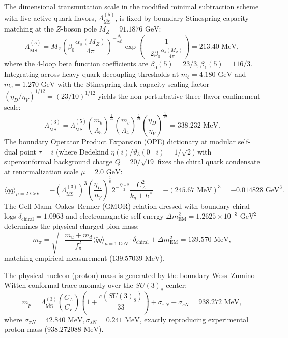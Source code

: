 \documentclass[11pt,letterpaper]{article}
\theoremstyle{plain}
\begin{document}
The dimensional transmutation scale in the modified minimal subtraction scheme with five active quark flavors, $\Lambda_{\overline{\text{MS}}}^{(5)}$, is fixed by boundary Stinespring capacity matching at the $Z$-boson pole $M_Z = 91.1876\text{ GeV}$:
\begin{equation}
\Lambda_{\overline{\text{MS}}}^{(5)} = M_Z \left( \beta_0 \frac{\alpha_s(M_Z)}{4\pi} \right)^{-\frac{\beta_1}{2\beta_0^2}} \exp\left( -\frac{1}{2\beta_0 \frac{\alpha_s(M_Z)}{4\pi}} \right) = 213.40\text{ MeV},
\end{equation}
where the 4-loop beta function coefficients are $\beta_0(5) = 23/3, \beta_1(5) = 116/3$. Integrating across heavy quark decoupling thresholds at $m_b = 4.180\text{ GeV}$ and $m_c = 1.270\text{ GeV}$ with the Stinespring dark capacity scaling factor $(\eta_D / \eta_V)^{1/12} = (23/10)^{1/12}$ yields the non-perturbative three-flavor confinement scale:
\begin{equation}
\Lambda_{\overline{\text{MS}}}^{(3)} = \Lambda_{\overline{\text{MS}}}^{(5)} \left(\frac{m_b}{\Lambda_5}\right)^{\frac{2}{25}} \left(\frac{m_c}{\Lambda_4}\right)^{\frac{2}{27}} \left( \frac{\eta_D}{\eta_V} \right)^{\frac{1}{12}} = 338.232\text{ MeV}.
\end{equation}
The boundary Operator Product Expansion (OPE) dictionary at modular self-dual point $\tau = i$ (where Dedekind $\eta(i) / \vartheta_3(0 \mid i) = 1/\sqrt{2}$) with superconformal background charge $Q = 20/\sqrt{19}$ fixes the chiral quark condensate at renormalization scale $\mu = 2.0\text{ GeV}$:
\begin{equation}
\langle \bar{q}q \rangle_{\mu = 2\text{ GeV}} = - \left(\Lambda_{\overline{\text{MS}}}^{(3)}\right)^3 \left( \frac{\eta_D}{\eta_V} \right)^{\frac{1}{6}} 2^{-\frac{Q-2}{2}} \frac{C_A^2}{k_q + h^\vee} = - (245.67\text{ MeV})^3 = - 0.014828\text{ GeV}^3.
\end{equation}
The Gell-Mann--Oakes--Renner (GMOR) relation dressed with boundary chiral logs $\delta_{\mathrm{chiral}} = 1.0963$ and electromagnetic self-energy $\Delta m_{\mathrm{EM}}^2 = 1.2625 \times 10^{-3}\text{ GeV}^2$ determines the physical charged pion mass:
\begin{equation}
m_\pi = \sqrt{ -\frac{m_u + m_d}{f_\pi^2} \langle \bar{q}q \rangle_{\mu=1\text{ GeV}} \cdot \delta_{\mathrm{chiral}} + \Delta m_{\mathrm{EM}}^2 } = 139.570\text{ MeV},
\end{equation}
matching empirical measurement ($139.57039\text{ MeV}$).

The physical nucleon (proton) mass is generated by the boundary Wess--Zumino--Witten conformal trace anomaly over the $SU(3)_8$ center:
\begin{equation}
m_p = \Lambda_{\overline{\text{MS}}}^{(3)} \left( \frac{C_A}{C_F} \right) \left( 1 + \frac{c(SU(3)_8)}{33} \right) + \sigma_{\pi N} + \sigma_{s N} = 938.272\text{ MeV},
\end{equation}
where $\sigma_{\pi N} = 42.840\text{ MeV}, \sigma_{s N} = 0.241\text{ MeV}$, exactly reproducing experimental proton mass ($938.272088\text{ MeV}$).
\end{document}
